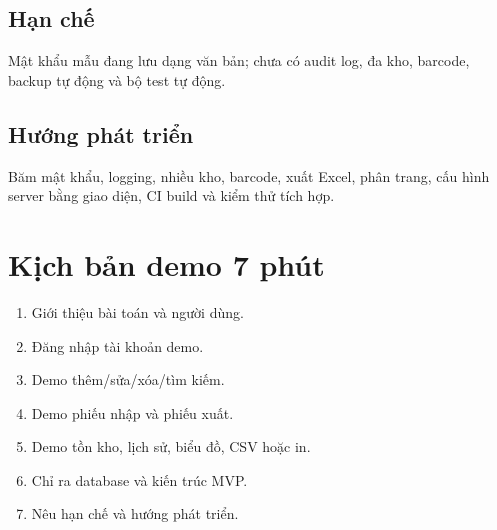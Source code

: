 \documentclass[12pt,a4paper]{report}
\begin{document}
\section{Hạn chế}
Mật khẩu mẫu đang lưu dạng văn bản; chưa có audit log, đa kho, barcode, backup
tự động và bộ test tự động.
\section{Hướng phát triển}
Băm mật khẩu, logging, nhiều kho, barcode, xuất Excel, phân trang, cấu hình
server bằng giao diện, CI build và kiểm thử tích hợp.

\chapter{Kịch bản demo 7 phút}
\begin{enumerate}
\item Giới thiệu bài toán và người dùng.
\item Đăng nhập tài khoản demo.
\item Demo thêm/sửa/xóa/tìm kiếm.
\item Demo phiếu nhập và phiếu xuất.
\item Demo tồn kho, lịch sử, biểu đồ, CSV hoặc in.
\item Chỉ ra database và kiến trúc MVP.
\item Nêu hạn chế và hướng phát triển.
\end{enumerate}

\appendix
\end{document}
